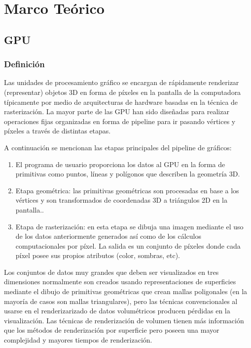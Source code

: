 \chapter{Marco Teórico}%

\section{GPU}
\subsection{Definición}

Las unidades de procesamiento gráfico se encargan de rápidamente renderizar (representar) objetos 3D en forma de píxeles en la pantalla de la computadora típicamente por medio de arquitecturas de hardware basadas en la técnica de rasterización. La mayor parte de las GPU han sido diseñadas para realizar operaciones fijas organizadas en forma de pipeline para ir pasando vértices y píxeles a través de distintas etapas.  

A continuación se mencionan las etapas principales del pipeline de gráficos:
\begin{enumerate}

\item El programa de usuario proporciona los datos al GPU en la forma de primitivas como puntos, líneas y polígonos que describen la geometría 3D. 
\item Etapa geométrica: las primitivas geométricas son procesadas en base a los vértices y son transformados de coordenadas 3D a triángulos 2D en la pantalla.. 
\item Etapa de rasterización: en esta etapa se dibuja una imagen mediante el uso de los datos anteriormente generados así como de los cálculos computacionales por píxel. La salida es un conjunto de píxeles donde cada píxel posee sus propios atributos (color, sombras, etc).  

\end{enumerate}

Los conjuntos de datos muy grandes que deben ser visualizados en tres dimensiones normalmente son creados usando representaciones de superficies mediante el dibujo de primitivas geométricas que crean mallas poligonales (en la mayoría de casos son mallas triangulares), pero las técnicas convencionales al usarse en el renderizarizado de datos volumétricos producen pérdidas en la visualización. Las técnicas de  renderización de volumen tienen más información que los métodos de renderización por superficie pero poseen una mayor complejidad y mayores tiempos de renderización.


